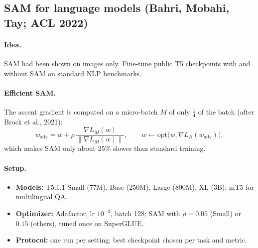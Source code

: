 \documentclass[11pt]{article}
\theoremstyle{plain}
\begin{document}
\subsection{SAM for language models (Bahri, Mobahi, Tay; ACL 2022)}

\paragraph{Idea.} SAM had been shown on images only. Fine-tune public T5 checkpoints with and without SAM on standard NLP benchmarks.

\paragraph{Efficient SAM.} The ascent gradient is computed on a micro-batch $M$ of only $\frac14$ of the batch (after Brock et al., 2021):
\begin{equation}
  w_{\mathrm{adv}} = w + \rho\, \frac{\nabla L_M(w)}{\|\nabla L_M(w)\|}, \qquad w \leftarrow \mathrm{opt}\big(w, \nabla L_B(w_{\mathrm{adv}})\big),
\end{equation}
which makes SAM only about 25\% slower than standard training.

\paragraph{Setup.}
\begin{itemize}
  \item \textbf{Models:} T5.1.1 Small (77M), Base (250M), Large (800M), XL (3B); mT5 for multilingual QA.
  \item \textbf{Optimizer:} Adafactor, lr $10^{-3}$, batch 128; SAM with $\rho = 0.05$ (Small) or $0.15$ (others), tuned once on SuperGLUE.
  \item \textbf{Protocol:} one run per setting; best checkpoint chosen per task and metric.
\end{itemize}
\end{document}
